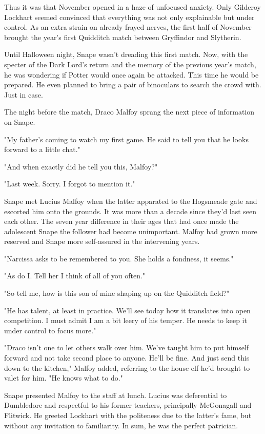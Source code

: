 \documentclass[a4paper,11pt]{article}
\begin{document}
Thus it was that November opened in a haze of unfocused anxiety. Only Gilderoy Lockhart seemed convinced that everything was not only explainable but under control. As an extra strain on already frayed nerves, the first half of November brought the year's first Quidditch match between Gryffindor and Slytherin.

Until Halloween night, Snape wasn't dreading this first match. Now, with the specter of the Dark Lord's return and the memory of the previous year's match, he was wondering if Potter would once again be attacked. This time he would be prepared. He even planned to bring a pair of binoculars to search the crowd with. Just in case.

The night before the match, Draco Malfoy sprang the next piece of information on Snape.

"My father's coming to watch my first game. He said to tell you that he looks forward to a little chat."

"And when exactly did he tell you this, Malfoy?"

"Last week. Sorry. I forgot to mention it."

Snape met Lucius Malfoy when the latter apparated to the Hogsmeade gate and escorted him onto the grounds. It was more than a decade since they'd last seen each other. The seven year difference in their ages that had once made the adolescent Snape the follower had become unimportant. Malfoy had grown more reserved and Snape more self-assured in the intervening years.

"Narcissa asks to be remembered to you. She holds a fondness, it seems."

"As do I. Tell her I think of all of you often."

"So tell me, how is this son of mine shaping up on the Quidditch field?"

"He has talent, at least in practice. We'll see today how it translates into open competition. I must admit I am a bit leery of his temper. He needs to keep it under control to focus more."

"Draco isn't one to let others walk over him. We've taught him to put himself forward and not take second place to anyone. He'll be fine. And just send this down to the kitchen," Malfoy added, referring to the house elf he'd brought to valet for him. "He knows what to do."

Snape presented Malfoy to the staff at lunch. Lucius was deferential to Dumbledore and respectful to his former teachers, principally McGonagall and Flitwick. He greeted Lockhart with the politeness due to the latter's fame, but without any invitation to familiarity. In sum, he was the perfect patrician.
\end{document}
